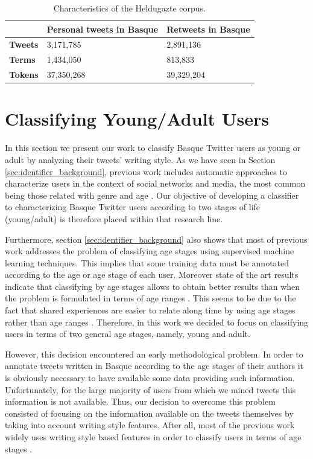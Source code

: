 \documentclass[information,article,submit,moreauthors,pdftex,10pt,a4paper]{Definitions/mdpi}
\begin{document}
\begin{table}[H]
  \centering
  \begin{tabular}{lll} \hline
     & \textbf{Personal tweets in Basque} & \textbf{Retweets in Basque}\\ \hline \hline
    \textbf{Tweets} & 3,171,785 & 2,891,136 \\
    \textbf{Terms} & 1,434,050 & 813,833 \\
    \textbf{Tokens}  & 37,350,268 & 39,329,204 \\ \hline
  \end{tabular}
  \caption{Characteristics of the Heldugazte corpus.}
  \label{tab:useful-data}
\end{table}

\section{Classifying Young/Adult Users}\label{sec:class-young-users}

In this section we present our work to classify Basque Twitter users as young or adult by analyzing their tweets' writing style. As we have seen in Section \ref{sec:identifier_background}, previous work includes automatic approaches to characterize users in the context of social networks and media, the most common being those related with genre and age \citep{cesare2017detection}. Our objective of developing a classifier to characterizing Basque Twitter users according to two stages of life (young/adult) is therefore placed within that research line.

Furthermore, section \ref{sec:identifier_background} also shows that most of previous work addresses the problem of classifying age stages using supervised machine learning techniques. This implies that some training data must be annotated according to the age or age stage of each user. Moreover state of the art  results indicate that classifying by age stages allows to obtain better results than when the problem is formulated in terms of age ranges \citep{nguyen2013old}. This seems to be due to the fact that shared experiences are easier to relate along time by using age stages rather than age ranges \citep{nguyen2016computational,eckert2017age}. Therefore, in this work we decided to focus on classifying users in terms of two general age stages, namely, young and adult.

However, this decision encountered an early methodological problem. In order to annotate tweets written in Basque according to the age stages of their authors it is obviously necessary to have available some data providing such information. Unfortunately, for the large majority of users from which we mined tweets this information is not available. Thus, our decision to overcome this problem consisted of focusing on the information available on the tweets themselves by taking into account writing style features. After all, most of the previous work widely uses writing style based features in order to classify users in terms of age stages \citep{rao2010classifying,al2012homophily,nguyen2013old,morgan2017predicting}.
\end{document}
